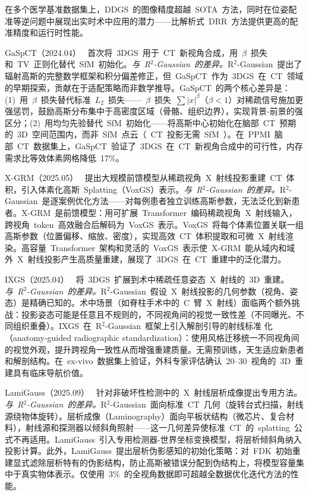 在多个医学基准数据集上，DDGS~的图像精度超越~SOTA~方法，同时在位姿配准等逆问题中展现出实时术中应用的潜力——比解析式~DRR~方法提供更高的配准精度和运行时性能。

GaSpCT（2024.04）~\cite{2404_03126} 首次将~3DGS~用于~CT~新视角合成，用~$\beta$~损失和~TV~正则化替代~SfM~初始化。\textit{与~R$^{2}$-Gaussian~的差异。}R$^{2}$-Gaussian~提出了辐射高斯的完整数学框架和积分偏差修正，但~GaSpCT~作为~3DGS~在~CT~领域的早期探索，贡献在于适配策略而非数学推导。GaSpCT~的两个核心差异是：(1)~用~$\beta$~损失替代标准~$L_2$~损失——~$\beta$~损失~$\sum |x|^\beta$（$\beta < 1$）对稀疏信号施加更强惩罚，鼓励高斯分布集中于高密度区域（骨骼、组织边界），实现背景-前景的强区分；(2)~用均匀先验替代~SfM~初始化——将高斯中心初始化在脑部~CT~预期的~3D~空间范围内，而非~SfM~点云（~CT~投影无需~SfM~）。在~PPMI~脑部~CT~数据集上，GaSpCT~验证了~3DGS~在~CT~新视角合成中的可行性，内存需求比等效体素网格降低~17\%。

X-GRM（2025.05）~\cite{2505_15235} 提出大规模前馈模型从稀疏视角~X~射线投影重建~CT~体积，引入体素化高斯~Splatting（VoxGS）表示。\textit{与~R$^{2}$-Gaussian~的差异。}R$^{2}$-Gaussian~是逐案例优化方法——对每例患者独立训练高斯参数，无法泛化到新患者。X-GRM~是前馈模型：用可扩展~Transformer~编码稀疏视角~X~射线输入，跨视角~token~高效融合后解码为~VoxGS~表示。VoxGS~将每个体素位置关联一组高斯参数（位置偏移、缩放、密度），实现高效~CT~体积提取和可微~X~射线渲染。高容量~Transformer~架构和灵活的~VoxGS~表示使~X-GRM~能从域内和域外~X~射线投影产生高质量重建，展现了~3DGS~在~CT~重建中的泛化潜力。

IXGS（2025.04）~\cite{2504_14699} 将~3DGS~扩展到术中稀疏任意姿态~X~射线的~3D~重建。\textit{与~R$^{2}$-Gaussian~的差异。}R$^{2}$-Gaussian~假设~X~射线投影的几何参数（视角、姿态）是精确已知的。术中场景（如脊柱手术中的~C~臂~X~射线）面临两个额外挑战：投影姿态可能是任意且不规则的，不同视角间的视觉一致性差（不同曝光、不同组织重叠）。IXGS~在~R$^{2}$-Gaussian~框架上引入解剖引导的射线标准 化（anatomy-guided radiographic standardization）：使用风格迁移统一不同视角间的视觉外观，提升跨视角一致性从而增强重建质量。无需预训练，天生适应新患者和解剖结构。在~ex-vivo~数据集上验证，外科专家评估确认~20--30~视角的~3D~重建具有临床导航价值。

LamiGauss（2025.09）~\cite{2509_13863} 针对非破坏性检测中的~X~射线层析成像提出专用方法。\textit{与~R$^{2}$-Gaussian~的差异。}R$^{2}$-Gaussian~面向标准~CT~几何（旋转台式扫描，射线源绕物体旋转）。层析成像（Laminography）面向平板状结构（微芯片、复合材料），射线源和探测器以倾斜角照射——这一几何差异使标准~CT~的~splatting~公式不再适用。LamiGauss~引入专用检测器-世界坐标变换模型，将层析倾斜角纳入投影计算。此外，LamiGauss~提出层析伪影感知的初始化策略：对~FDK~初始重建显式滤除层析特有的伪影结构，防止高斯被错误分配到伪结构上，将模型容量集中于真实物体表示。仅使用~3\%~的全视角数据即可超越全数据优化迭代方法的性能。

